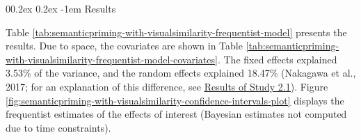 \documentclass[
  12pt,
  man,floatsintext]{apa7}
\makeatletter
\let\oldparagraph\paragraph
\renewcommand{\paragraph}[1]{\oldparagraph{#1}\mbox{}}
\renewcommand{\paragraph}{\@startsection{paragraph}{4}{\parindent}%
  {0\baselineskip \@plus 0.2ex \@minus 0.2ex}%
  {-1em}%
  {\normalfont\normalsize\bfseries\itshape\typesectitle}}
\makeatother
\begin{document}
\hypertarget{results}{%
\paragraph{Results}\label{results}}

Table \ref{tab:semanticpriming-with-visualsimilarity-frequentist-model} presents the results. Due to space, the covariates are shown in Table \ref{tab:semanticpriming-with-visualsimilarity-frequentist-model-covariates}. The fixed effects explained 3.53\% of the variance, and the random effects explained 18.47\% (Nakagawa et al., 2017; for an explanation of this difference, see \protect\hyperlink{semanticpriming-results}{\underline{Results of Study 2.1}}). Figure \ref{fig:semanticpriming-with-visualsimilarity-confidence-intervals-plot} displays the frequentist estimates of the effects of interest (Bayesian estimates not computed due to time constraints).
\end{document}
